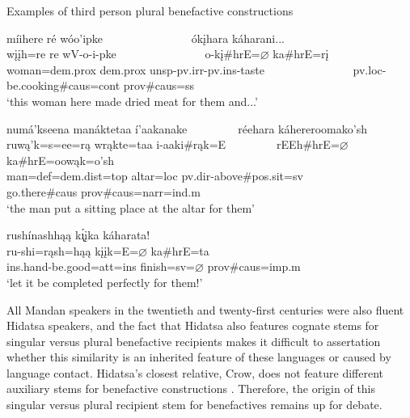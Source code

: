 \begin{exe}
    \item\label{Ch5ExBenefactives2} Examples of third person plural benefactive constructions

    \begin{xlist}
        \item\label{Ch5ExBenefactives2A} \glll míihere ré wóo'ipke ~ ~ ~ ~ ~ ~ ~ ~ ~ ókįhara káharani...\\
        wįįh=re re wV-o-i-pke ~ ~ ~ ~ ~ ~ ~ ~ ~ o-kį\#hrE=$\varnothing$ ka\#hrE=rį\\
        \textnormal{woman}=dem.prox dem.prox unsp-pv.irr-pv.ins-\textnormal{taste} ~ ~ ~ ~ ~ ~ ~ ~ ~ pv.loc-\textnormal{be.cooking}\#caus=cont prov\#caus=ss\\
        \glt `this woman here made dried meat for them and...' \citep[204]{hollow1973a}

        \item\label{Ch5ExBenefactives2B} \glll numá'kseena manáktetaa í'aakanake ~ ~ ~ ~ ~ réehara káhereroomako'sh\\
        ruwą'k=s=ee=rą wrąkte=taa i-aaki\#rąk=E ~ ~ ~ ~ ~ rEEh\#hrE=$\varnothing$ ka\#hrE=oowąk=o'sh\\
        \textnormal{man}=def=dem.dist=top \textnormal{altar}=loc pv.dir-\textnormal{above}\#pos.sit=sv ~ ~ ~ ~ ~ \textnormal{go.there}\#caus prov\#caus=narr=ind.m\\
        \glt `the man put a sitting place at the altar for them' \citep[174]{hollow1973b}

        \item\label{Ch5ExBenefactives2C} \glll rushínashhąą k\'{ı̨}įka káharata!\\
        ru-shi=rąsh=hąą kįįk=E=$\varnothing$  ka\#hrE=ta\\
        ins.hand-\textnormal{be.good}=att=ins \textnormal{finish}=sv=$\varnothing$ prov\#caus=imp.m\\
        \glt `let it be completed perfectly for them!' \citep[262]{trechter2012}
    \end{xlist}
\end{exe}

All Mandan speakers in the twentieth and twenty-first centuries were also fluent Hidatsa speakers, and the fact that Hidatsa also features cognate stems for singular versus plural benefactive recipients makes it difficult to assertation whether this similarity is an inherited feature of these languages or caused by language contact. Hidatsa's closest relative, Crow, does not feature different auxiliary stems for benefactive constructions \citep[145]{graczyk2007}. Therefore, the origin of this singular versus plural recipient stem for benefactives remains up for debate.

